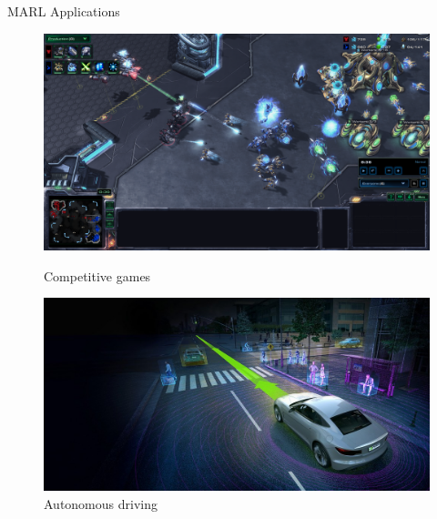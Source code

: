 \begin{frame}{MARL Applications}
  \begin{figure}
    \centering
    \begin{minipage}{.5\linewidth}
        \centering
        \includegraphics[width=.65\linewidth, keepaspectratio]{images/1_starcraft.png}
        \caption{Competitive games}
    \end{minipage}%
    \begin{minipage}{.5\linewidth}
        \centering
        \includegraphics[width=.7\linewidth, keepaspectratio]{images/1_self_driving.png}
        \caption{Autonomous driving}
    \end{minipage}
    

\end{figure}
\end{frame}
